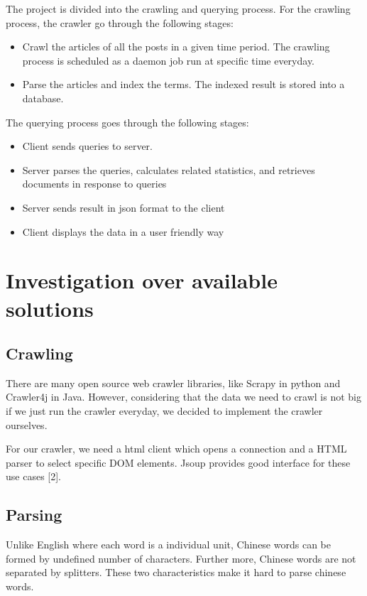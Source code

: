\documentclass{article}
\begin{document}
The project is divided into the crawling and querying process. For the crawling process, the crawler go through the following stages:

\begin{itemize}
  \item Crawl the articles of all the posts in a given time period. The crawling process is scheduled as a daemon job run at specific time everyday. 
  \item Parse the articles and index the terms. The indexed result is stored into a database.
\end{itemize}

The querying process goes through the following stages:

\begin{itemize}
  \item Client sends queries to server.
  \item Server parses the queries, calculates related statistics, and retrieves documents in response to queries
  \item Server sends result in json format to the client
  \item Client displays the data in a user friendly way
\end{itemize}

\section{Investigation over available solutions}
\subsection{Crawling}
There are many open source web crawler libraries, like Scrapy in python and Crawler4j in Java. However, considering that the data we need to crawl is not big if we just run the crawler everyday, we decided to implement the crawler ourselves.

For our crawler, we need a html client which opens a connection and a HTML parser to select specific DOM elements. Jsoup provides good interface for these use cases [2].

\subsection{Parsing}
Unlike English where each word is a individual unit, Chinese words can be formed by undefined number of characters. Further more, Chinese words are not separated by splitters. These two characteristics make it hard to parse chinese words.
\end{document}
